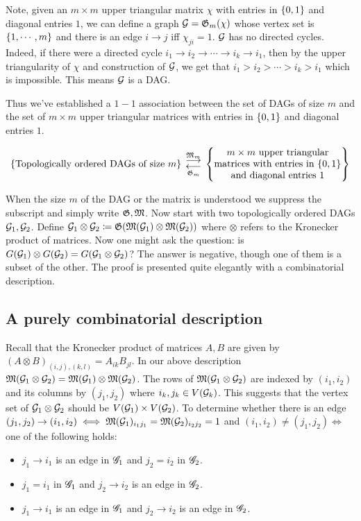 Note, given an $m\times m$ upper triangular matrix $\chi$ with entries in $\left\{0,1\right\}$ and diagonal entries $1$, we can define a graph ${\mathcal{G}} = {\mathfrak{G}}_m(\chi)$ whose vertex set is $\left\{1,\cdots,m\right\}$ and there is an edge $i\to j$ iff $\chi_{ji}=1$. ${\mathcal{G}}$ has no directed cycles. Indeed, if there were a directed cycle $i_1\to i_2\to\cdots \to i_k\to i_1$, then by the upper triangularity of $\chi$  and construction of ${\mathcal{G}}$, we get that $i_1 > i_2 > \cdots > i_k > i_1$ which is impossible. This means ${\mathcal{G}}$ is a DAG.

Thus we've established a $1-1$ association between the set of DAGs of size $m$ and the set of $m\times m$ upper triangular matrices with entries in $\left\{0,1\right\}$ and diagonal entries $1$.

\[
\set{\text{Topologically ordered DAGs of size }m}
\;
\begin{gathered}
\overset{\fM_m}{\longrightarrow} \\[-2ex]
\underset{\fG_m}{\longleftarrow}
\end{gathered}
\;
\left\{
  \begin{tabular}{@{} c @{}}
  $m\times m$ upper triangular\\
  matrices with entries in $\set{0,1}$\\
  and diagonal entries $1$
  \end{tabular}
\right\}
\]

When the size $m$ of the DAG or the matrix is understood we suppress the subscript and simply write ${\mathfrak{G}},{\mathfrak{M}}$. Now start with two topologically ordered DAGs ${\mathcal{G}}_{1}, {\mathcal{G}}_2$. Define ${\mathcal{G}}_1\otimes {\mathcal{G}}_2 \coloneqq {\mathfrak{G}}({\mathfrak{M}}({\mathcal{G}}_1)\otimes {\mathfrak{M}}({\mathcal{G}}_2))$ where $\otimes$ refers to the Kronecker product of matrices. Now one might ask the question: is $G({\mathcal{G}}_1)\otimes G({\mathcal{G}}_2) = G({\mathcal{G}}_1\otimes {\mathcal{G}}_2)$? The answer is negative, though one of them is a subset of the other. The proof is presented quite elegantly with a combinatorial description.

\subsection{A purely combinatorial description}

Recall that the Kronecker product of matrices $A,B$ are given by $\displaystyle (A\otimes B)_{(i,j),(k,l)} = A_{ik}B_{jl}$. In our above description ${\mathfrak{M}}({\mathcal{G}}_1\otimes {\mathcal{G}}_2) = {\mathfrak{M}}({\mathcal{G}}_1)\otimes {\mathfrak{M}}({\mathcal{G}}_2)$. The rows of ${\mathfrak{M}}({\mathcal{G}}_1\otimes {\mathcal{G}}_2)$ are indexed by $(i_1,i_2)$ and its columns by $(j_1,j_2)$ where $i_k,j_k \in V({\mathcal{G}}_k)$. This suggests that the vertex set of ${\mathcal{G}}_1\otimes {\mathcal{G}}_2$ should be $V({\mathcal{G}}_1)\times V({\mathcal{G}}_2)$. To determine whether there is an edge $(j_1,j_2) \to (i_1,i_2) \iff {\mathfrak{M}}({\mathcal{G}}_1)_{i_1j_1} = {\mathfrak{M}}({\mathcal{G}}_2)_{i_2j_2} = 1 $ and $(i_1,i_2) \neq (j_1,j_2) \iff$ one of the following holds:
\begin{itemize}
\item $j_1\to i_1$ is an edge in ${\mathscr{G}}_1$ and $j_2=i_2$ in ${\mathscr{G}}_2$.
\item $j_1 = i_1$ in ${\mathscr{G}}_1$ and $j_2\to i_2$ is an edge  in ${\mathscr{G}}_2$.
\item $j_1 \to i_1$ is an edge in ${\mathscr{G}}_1$ and $j_2\to i_2$ is an edge  in ${\mathscr{G}}_2$.
\end{itemize}

